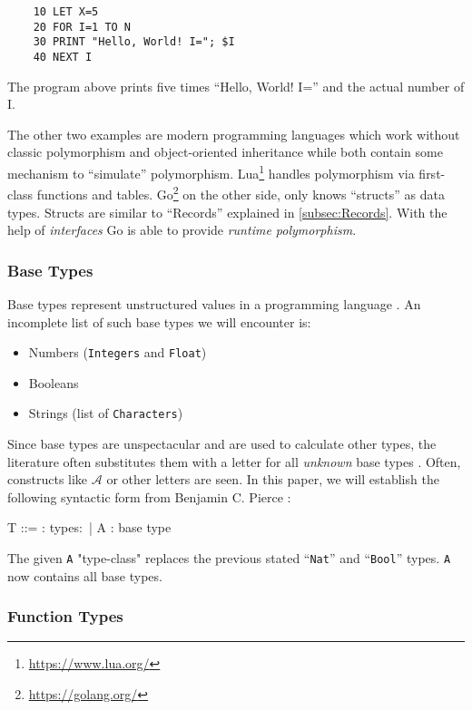 \begin{verbatim}
    10 LET X=5
    20 FOR I=1 TO N
    30 PRINT "Hello, World! I="; $I
    40 NEXT I
\end{verbatim}

The program above prints five times ``Hello, World! I='' and the actual
number of I.

The other two examples are modern programming languages which work without
classic polymorphism and object-oriented inheritance while both contain
some mechanism to ``simulate'' polymorphism. Lua\footnote{\url{https://www.lua.org/}}
handles polymorphism via first-class functions and tables. Go\footnote{\url{https://golang.org/}}
on the other side, only knows ``structs'' as data types. Structs are similar to
``Records'' explained in \cref{subsec:Records}. With the help of \textit{interfaces}
Go is able to provide \textit{runtime polymorphism}.

\subsubsection{Base Types}

Base types represent unstructured values in a programming language \cite{pierce2002ProgLang}.
An incomplete list of such base types we will encounter is:

\begin{itemize}
    \item Numbers (\texttt{Integers} and \texttt{Float})
    \item Booleans
    \item Strings (list of \texttt{Characters})
\end{itemize}

Since base types are unspectacular and are used to calculate other
types, the literature often substitutes them with a letter for all
\textit{unknown} base types \cite{pierce2002ProgLang}. Often,
constructs like $\mathcal{A}$ or other letters are seen. In this
paper, we will establish the following syntactic form
from Benjamin C. Pierce \cite{pierce2002ProgLang}:

\begin{bnfgrammar}
    T ::= : types$\colon$
    | A : base type
\end{bnfgrammar}

The given \texttt{A} "type-class" replaces the previous stated
``\texttt{Nat}'' and ``\texttt{Bool}'' types. \texttt{A} now contains
all base types.

\subsubsection{Function Types}

